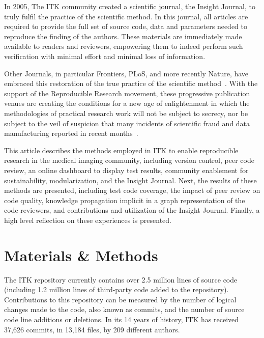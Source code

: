 \documentclass{frontiersENG} %
\begin{document}
In 2005, The ITK community created a scientific journal, the Insight Journal,
to truly fulfil the practice of the scientific method.  In this journal, all
articles are required to provide the full set of source code, data and
parameters needed to reproduce the finding of the authors. These materials are
immediately made available to readers and reviewers, empowering them to indeed
perform such verification with minimal effort and minimal loss of information.

Other Journals, in particular Frontiers, PLoS, and more recently Nature, have
embraced this restoration of the true practice of the scientific
method~\cite{NatureEditorial2013,NatureEditorial2012,Mobley2013}.  With the
support of the Reproducible Research movement, these progressive publication
venues are creating the conditions for a new age of enlightenment in which the
methodologies of practical research work will not be subject to secrecy, nor be
subject to the veil of suspicion that many incidents of scientific fraud and
data manufacturing reported in recent months~\cite{Sandve2013}.

%
%

This article describes the methods employed in ITK to enable reproducible
research in the medical imaging community, including version control, peer code
review, an online dashboard to display test results, community enablement for
sustainability, modularization, and the Insight Journal.  Next, the results of
these methods are presented, including test code coverage, the impact of peer
review on code quality, knowledge propagation implicit in a graph
representation of the code reviewers, and contributions and utilization of the
Insight Journal.  Finally, a high level reflection on these experiences is
presented.


\section{Materials \& Methods}
The ITK repository currently contains over 2.5 million lines of source code
(including 1.2 million lines of third-party code added to the repository).
Contributions to this repository can be measured by the number of logical
changes made to the code, also known as commits, and the number of source code
line additions or deletions. In its 14 years of history, ITK has received
37,626 commits, in 13,184 files, by 209 different authors.
\end{document}
